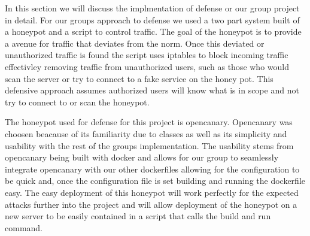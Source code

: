 In this section we will discuss the implmentation of defense or our group project in detail. For our groups approach to defense we used a two part system built of a honeypot and a script to control traffic. The goal of the honeypot is to provide a avenue for traffic that deviates from the norm. Once this deviated or unauthorized traffic is found the script uses iptables to block incoming traffic effectivley removing traffic from unauthorized users, such as those who would scan the server or try to connect to a fake service on the honey pot. This defensive approach assumes authorized users will know what is in scope and not try to connect to or scan the honeypot. 

The honeypot used for defense for this project is opencanary. Opencanary was choosen beacause of its familiarity due to classes as well as its simplicity and usability with the rest of the groups implementation. The usability stems from opencanary being built with docker and allows for our group to seamlessly integrate opencanary with our other dockerfiles allowing for the configuration to be quick and, once the configuration file is set building and running the dockerfile easy. The easy deployment of this honeypot will work perfectly for the expected attacks further into the project and will allow deployment of the honeypot on a new server to be easily contained in a script that calls the build and run command. 
